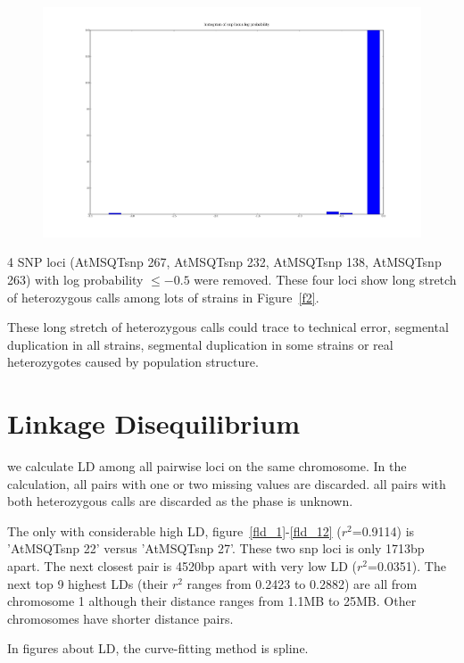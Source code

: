 \documentclass[a4paper,10pt]{article}
\begin{document}
\begin{figure}
\includegraphics[width=1\textwidth]{figures/data_d110_c0_5_SNP_locus_log_prob.png}
\caption{}\label{f3}
\end{figure}

4 SNP loci (AtMSQTsnp 267, AtMSQTsnp 232, AtMSQTsnp 138, AtMSQTsnp 263) with log probability $\leq -0.5$ were removed. These four loci show long stretch of heterozygous calls among lots of strains in Figure~\ref{f2}.

These long stretch of heterozygous calls could trace to technical error, segmental duplication in all strains, segmental duplication in some strains  or real heterozygotes caused by population structure.

\section{Linkage Disequilibrium}
we calculate LD among all pairwise loci on the same chromosome. In the calculation, all pairs with one or two missing values are discarded. all pairs with both heterozygous calls are discarded as the phase is unknown.

The only with considerable high LD, figure~\ref{fld_1}-\ref{fld_12} ($r^2$=0.9114) is 'AtMSQTsnp 22' versus 'AtMSQTsnp 27'. These two snp loci is only 1713bp apart. The next closest pair is 4520bp apart with very low LD ($r^2$=0.0351). The next top 9 highest LDs (their $r^2$ ranges from 0.2423 to 0.2882) are all from chromosome 1 although their distance ranges from 1.1MB to 25MB. Other chromosomes have shorter distance pairs.

In figures about LD, the curve-fitting method is spline.
\end{document}
